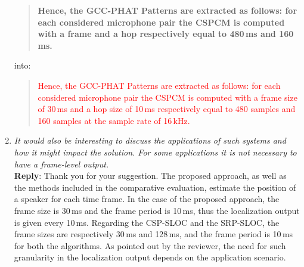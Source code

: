 \documentclass[11pt, technote, letterpaper, oneside, onecolumn]{IEEEtran}
\begin{document}
\begin{enumerate}
\begin{quote}
	\textbf{Hence, the GCC-PHAT Patterns are extracted as follows: for each considered microphone pair the CSPCM is computed with a frame and a hop respectively equal to 480\,ms and 160\,ms.}
\end{quote}
into:
\begin{quote}
	\textcolor{red}{Hence, the GCC-PHAT Patterns are extracted as follows: for each considered microphone pair the CSPCM is computed with a frame size of 30\,ms and a hop size of 10\,ms respectively equal to 480 samples and 160 samples at the sample rate of 16\,kHz.}
\end{quote}


\item \textit{It would also be interesting to discuss the applications of such systems and how it might impact the solution. For some applications it is not necessary to have a frame-level output.\\}
\textbf{Reply}: Thank you for your suggestion. The proposed approach, as well as the methods included in the comparative evaluation, estimate the position of a speaker for each time frame. In the case of the proposed approach, the frame size is 30\,ms and the frame period is 10\,ms, thus the localization output is given every 10\,ms. Regarding the CSP-SLOC and the SRP-SLOC, the frame sizes are respectively 30\,ms and 128\,ms, and the frame period is 10\,ms for both the algorithms. As pointed out by the reviewer, the need for such granularity in the localization output depends on the application scenario. %

\end{enumerate}
\end{document}
